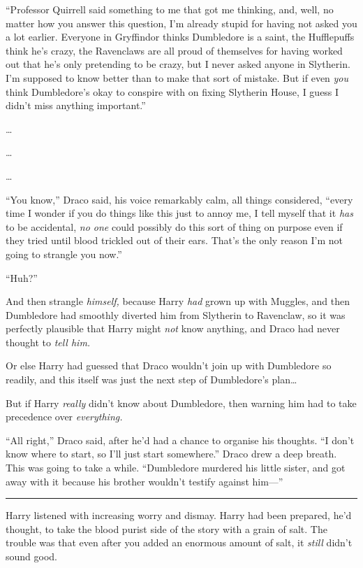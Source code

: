 ``Professor Quirrell said something to me that got me thinking, and,
well, no matter how you answer this question, I'm already stupid for
having not asked you a lot earlier. Everyone in Gryffindor thinks
Dumbledore is a saint, the Hufflepuffs think he's crazy, the Ravenclaws
are all proud of themselves for having worked out that he's only
pretending to be crazy, but I never asked anyone in Slytherin. I'm
supposed to know better than to make that sort of mistake. But if even
\emph{you} think Dumbledore's okay to conspire with on fixing Slytherin
House, I guess I didn't miss anything important.''

\ldots{}

\ldots{}

\ldots{}

``You know,'' Draco said, his voice remarkably calm, all things
considered, ``every time I wonder if you do things like this just to
annoy me, I tell myself that it \emph{has} to be accidental, \emph{no
one} could possibly do this sort of thing on purpose even if they tried
until blood trickled out of their ears. That's the only reason I'm not
going to strangle you now.''

``Huh?''

And then strangle \emph{himself,} because Harry \emph{had} grown up with
Muggles, and then Dumbledore had smoothly diverted him from Slytherin to
Ravenclaw, so it was perfectly plausible that Harry might \emph{not}
know anything, and Draco had never thought to \emph{tell him.}

Or else Harry had guessed that Draco wouldn't join up with Dumbledore so
readily, and this itself was just the next step of Dumbledore's
plan\ldots{}

But if Harry \emph{really} didn't know about Dumbledore, then warning
him had to take precedence over \emph{everything.}

``All right,'' Draco said, after he'd had a chance to organise his
thoughts. ``I don't know where to start, so I'll just start somewhere.''
Draco drew a deep breath. This was going to take a while. ``Dumbledore
murdered his little sister, and got away with it because his brother
wouldn't testify against him---''

\begin{center}\rule{3in}{0.4pt}\end{center}

Harry listened with increasing worry and dismay. Harry had been
prepared, he'd thought, to take the blood purist side of the story with
a grain of salt. The trouble was that even after you added an enormous
amount of salt, it \emph{still} didn't sound good.

